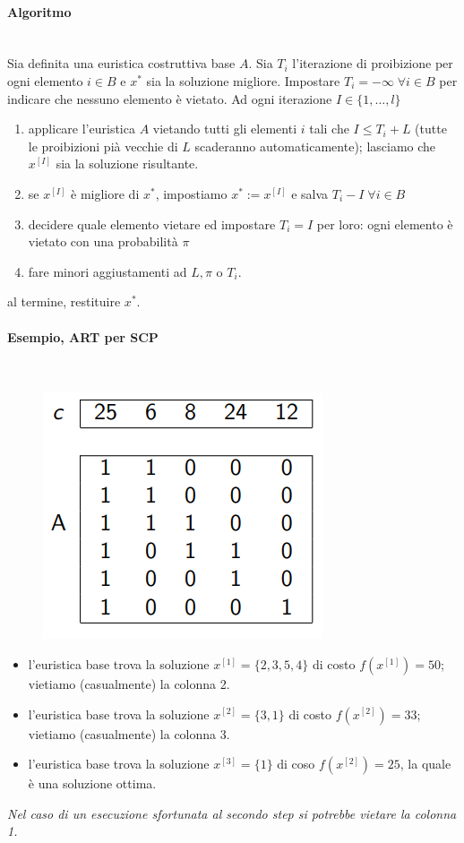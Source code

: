 \documentclass{article}
\begin{document}
\paragraph{Algoritmo}\mbox{}\\
Sia definita una euristica costruttiva base $A$. Sia $T_i$ l'iterazione di proibizione per ogni
elemento $i\in B$ e $x^*$ sia la soluzione migliore. Impostare $T_i=-\infty\;\forall i \in B$ per
indicare che nessuno elemento è vietato.
Ad ogni iterazione $I\in\{1,\dots,l\}$
\begin{enumerate}
    \item applicare l'euristica $A$ vietando tutti gli elementi $i$ tali che $I\leq T_i+L$
    (tutte le proibizioni pià vecchie di $L$ scaderanno automaticamente); lasciamo che $x^{[I]}$
    sia la soluzione risultante.
    \item se $x^{[I]}$ è migliore di $x^*$, impostiamo $x^*:=x^{[I]}$ e salva
    $T_i-I\;\forall i\in B$
    \item decidere quale elemento vietare ed impostare $T_i=I$ per loro: ogni elemento
    è vietato con una probabilità $\pi$
    \item fare minori aggiustamenti ad $L,\pi$ o $T_i$.
\end{enumerate}
al termine, restituire $x^*$.
\paragraph{Esempio, ART per SCP}\mbox{}\\

\begin{figure}[H]
    \centering
    \includegraphics[scale=0.5]{images/ART_SCP.png}
\end{figure}

\begin{itemize}
    \item l'euristica base trova la soluzione $x^{[1]}=\{2,3,5,4\}$ di costo $f\left(x^{[1]}\right)=50$;
    vietiamo (casualmente) la colonna 2.
    \item l'euristica base trova la soluzione $x^{[2]}=\{3,1\}$ di costo $f\left(x^{[2]}\right)=33$;
    vietiamo (casualmente) la colonna 3.
    \item l'euristica base trova la soluzione $x^{[3]}=\{1\}$ di coso $f\left(x^{[2]}\right)=25$,
    la quale è una soluzione ottima.
\end{itemize}
\textit{Nel caso di un esecuzione sfortunata al secondo step si potrebbe vietare la colonna 1.}
\end{document}
